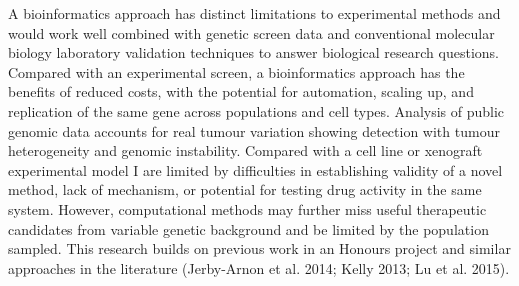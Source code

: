 A \gls{bioinformatics} approach has distinct limitations to experimental methods and would work well combined with genetic screen data and conventional molecular biology laboratory validation techniques to answer biological research questions.  Compared with an experimental screen, a \gls{bioinformatics} approach has the benefits of reduced costs, with the potential for automation, scaling up, and replication of the same gene across populations and cell types.  Analysis of public \gls{genomic} data accounts for real tumour variation showing detection with tumour heterogeneity and genomic instability.  Compared with a cell line or xenograft experimental model I are limited by difficulties in establishing validity of a novel method, lack of mechanism, or potential for testing drug activity in the same system.  However, computational methods may further miss useful therapeutic candidates from variable genetic background and be limited by the population sampled.  This research builds on previous work in an Honours project and similar approaches in the literature (Jerby-Arnon et al. 2014; Kelly 2013; Lu et al. 2015).
\fi